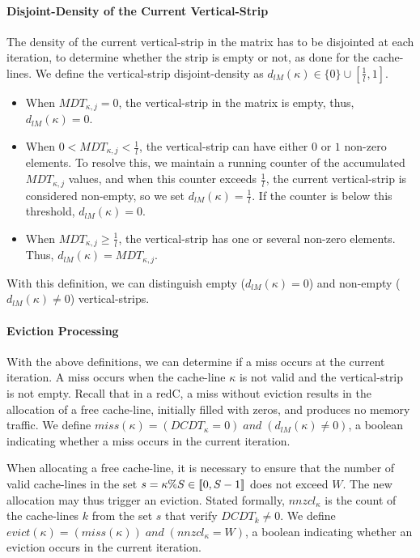 \paragraph{Disjoint-Density of the Current Vertical-Strip}
The density of the current vertical-strip in the matrix has to be disjointed at each iteration, to determine whether the strip is empty or not, as done for the cache-lines.
We define the vertical-strip disjoint-density as $d_\mathit{lM}(\kappa) \in \{0\} \cup [\frac{1}{l}, 1]$.
\begin{itemize}
    \item When $\mathit{MDT}_{\kappa,j} = 0$, the vertical-strip in the matrix is empty, thus, $d_\mathit{lM}(\kappa) = 0$.
    \item When $0 < \mathit{MDT}_{\kappa,j} < \frac{1}{l}$, the vertical-strip can have either $0$ or $1$ non-zero elements.
            To resolve this, we maintain a running counter of the accumulated $\mathit{MDT}_{\kappa,j}$ values, and when this counter exceeds $\frac{1}{l}$, the current vertical-strip is considered non-empty, so we set $d_\mathit{lM}(\kappa) = \frac{1}{l}$.
            If the counter is below this threshold, $d_\mathit{lM}(\kappa) = 0$.
    \item When $\mathit{MDT}_{\kappa,j} \geqslant \frac{1}{l}$, the vertical-strip has one or several non-zero elements.
          Thus, $d_\mathit{lM}(\kappa) = \mathit{MDT}_{\kappa,j}$.
\end{itemize}

With this definition, we can distinguish empty ($d_\mathit{lM}(\kappa) = 0$) and non-empty ($d_\mathit{lM}(\kappa) \ne 0$) vertical-strips.

\paragraph{Eviction Processing}
With the above definitions, we can determine if a \gls{miss} occurs at the current iteration.
A \gls{miss} occurs when the cache-line $\kappa$ is not valid and the vertical-strip is not empty.
Recall that in a \gls{redC}, a \gls{miss} without \gls{eviction} results in the allocation of a free cache-line, initially filled with zeros, and produces no memory traffic.
We define \mbox{$\mathit{miss}(\kappa) = (\mathit{DCDT}_\kappa = 0) \; and \; (d_\mathit{lM}(\kappa) \ne 0)$}, a boolean indicating whether a \gls{miss} occurs in the current iteration.

When allocating a free cache-line, it is necessary to ensure that the number of valid cache-lines in the \gls{set} \mbox{$s = \kappa \% S \in [\![0,S-1]\!]$} does not exceed $W$.
The new allocation may thus trigger an \gls{eviction}.
Stated formally, $\mathit{nnzcl}_\kappa$ is the count of the cache-lines $k$ from the \gls{set} $s$ that verify $\mathit{DCDT}_k \ne 0$.
We define \mbox{$\mathit{evict}(\kappa) = (\mathit{miss}(\kappa)) \; and \; (\mathit{nnzcl}_\kappa = W)$}, a boolean indicating whether an \gls{eviction} occurs in the current iteration.

